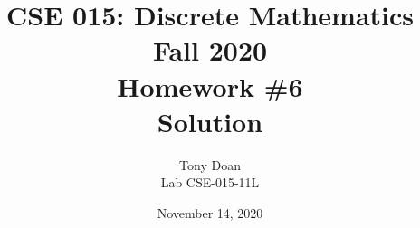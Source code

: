 \documentclass[11pt]{article}
\begin{document}
\author{Tony Doan \\
Lab CSE-015-11L }

\title{CSE 015: Discrete Mathematics\\
Fall 2020\\
Homework \#6\\
Solution}

\date{November 14, 2020 }
\maketitle

\end{document}
